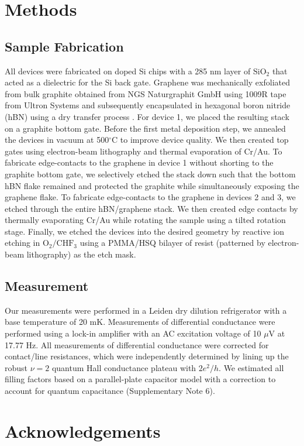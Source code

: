 \documentclass[%
reprint,amsmath,amssymb,aps,prl,superscriptaddress,
twocolumn
]{revtex4-1}
\begin{document}
	\section{Methods} 
	\subsection{Sample Fabrication} All devices were fabricated on doped Si chips with a 285 nm layer of $\mathrm{SiO}_2$ that acted as a dielectric for the Si back gate. Graphene was mechanically exfoliated from bulk graphite obtained from NGS Naturgraphit GmbH using 1009R tape from Ultron Systems and subsequently encapsulated in hexagonal boron nitride (hBN) using a dry transfer process \cite{Wang2013}. For device 1, we placed the resulting stack on a graphite bottom gate. Before the first metal deposition step, we annealed the devices in vacuum at 500$^\circ$C to improve device quality. We then created top gates using electron-beam lithography and thermal evaporation of Cr/Au. To fabricate edge-contacts to the graphene in device 1 without shorting to the graphite bottom gate, we selectively etched the stack down such that the bottom hBN flake remained and protected the graphite while simultaneously exposing the graphene flake. To fabricate edge-contacts to the graphene in devices 2 and 3, we etched through the entire hBN/graphene stack. We then created edge contacts by thermally evaporating Cr/Au while rotating the sample using a tilted rotation stage. Finally, we etched the devices into the desired geometry by reactive ion etching in $\mathrm{O}_2/\mathrm{CHF}_3$ using a PMMA/HSQ bilayer of resist (patterned by electron-beam lithography) as the etch mask.
	\subsection{Measurement} Our measurements were performed in a Leiden dry dilution refrigerator with a base temperature of 20 mK. Measurements of differential conductance were performed using a lock-in amplifier with an AC excitation voltage of 10 $\mu$V at 17.77 Hz. All measurements of differential conductance were corrected for contact/line resistances, which were independently determined by lining up the robust $\nu = 2$ quantum Hall conductance plateau with $2e^2/h$. We estimated all filling factors based on a parallel-plate capacitor model with a correction to account for quantum capacitance (Supplementary Note 6).
	
	
	\section{Acknowledgements}
\end{document}
